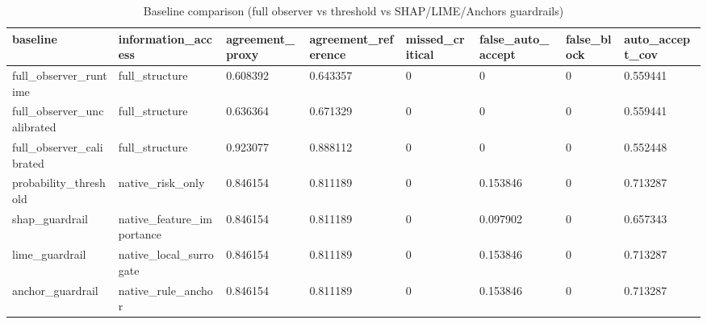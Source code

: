 \begin{table}[h]
\centering
\caption{Baseline comparison (full observer vs threshold vs SHAP/LIME/Anchors guardrails)}
\label{tab:baseline\_comparison}
\begin{tabular}{|l|l|l|l|l|l|l|l|}
\hline
baseline & information\_access & agreement\_proxy & agreement\_reference & missed\_critical & false\_auto\_accept & false\_block & auto\_accept\_cov \\
\hline
full\_observer\_runtime & full\_structure & 0.608392 & 0.643357 & 0 & 0 & 0 & 0.559441 \\
\hline
full\_observer\_uncalibrated & full\_structure & 0.636364 & 0.671329 & 0 & 0 & 0 & 0.559441 \\
\hline
full\_observer\_calibrated & full\_structure & 0.923077 & 0.888112 & 0 & 0 & 0 & 0.552448 \\
\hline
probability\_threshold & native\_risk\_only & 0.846154 & 0.811189 & 0 & 0.153846 & 0 & 0.713287 \\
\hline
shap\_guardrail & native\_feature\_importance & 0.846154 & 0.811189 & 0 & 0.097902 & 0 & 0.657343 \\
\hline
lime\_guardrail & native\_local\_surrogate & 0.846154 & 0.811189 & 0 & 0.153846 & 0 & 0.713287 \\
\hline
anchor\_guardrail & native\_rule\_anchor & 0.846154 & 0.811189 & 0 & 0.153846 & 0 & 0.713287 \\
\hline
\end{tabular}
\end{table}
